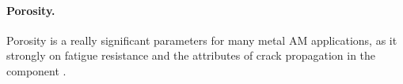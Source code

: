 \paragraph{Porosity.} Porosity is a really significant parameters for many metal AM applications, as it strongly on fatigue resistance and the attributes of crack propagation in the component \cite{edwards_electron_2013}. 
\begin{figure}
    \centering
    \qquad
\end{figure}

